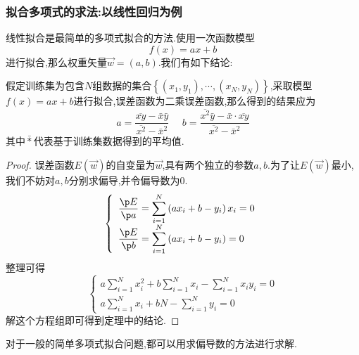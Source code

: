 \documentclass{ctexart}
\begin{document}
\subsubsection{拟合多项式的求法:以线性回归为例}
线性拟合是最简单的多项式拟合的方法.使用一次函数模型
\[f(x)=ax+b\]
进行拟合,那么权重矢量$\vec{w}=(a,b)$.我们有如下结论:
\begin{theorem}[简单线性回归的参数]
    假定训练集为包含$N$组数据的集合$\left\{\left(x_1,y_1\right),\cdots,\left(x_N,y_N\right)\right\}$,采取模型$f(x)=ax+b$进行拟合,误差函数为二乘误差函数,那么得到的结果应为
    \[a=\dfrac{\overline{xy}-\bar{x}\bar{y}}{\overline{x^2}-{\bar{x}}^2}\ \ \ \ \ \ b=\dfrac{\overline{x^2}\bar{y}-\bar{x}\cdot\overline{xy}}{\overline{x^2}-{\bar{x}}^2}\]
    其中$\bar{*}$代表基于训练集数据得到的平均值.
\end{theorem}
\begin{proof}
    误差函数$E(\vec{w})$的自变量为$\vec{w}$,具有两个独立的参数$a,b$.为了让$E(\vec{w})$最小,我们不妨对$a,b$分别求偏导,并令偏导数为$0$.
    \[\left\{\begin{array}{l}
        \displaystyle\dfrac{\p E}{\p a}=\sum_{i=1}^{N}\left(ax_i+b-y_i\right)x_i=0\\
        \displaystyle\dfrac{\p E}{\p b}=\sum_{i=1}^{N}\left(ax_i+b-y_i\right)=0
    \end{array}\right.\]
    整理可得
    \[\left\{\begin{array}{l}
        \displaystyle a\sum_{i=1}^{N}x_i^2+b\sum_{i=1}^{N}x_i-\sum_{i=1}^{N}x_iy_i=0\\
        \displaystyle a\sum_{i=1}^{N}x_i+bN-\sum_{i=1}^{N}y_i=0
    \end{array}\right.\]
    解这个方程组即可得到定理中的结论.
\end{proof}
对于一般的简单多项式拟合问题,都可以用求偏导数的方法进行求解.
\end{document}
